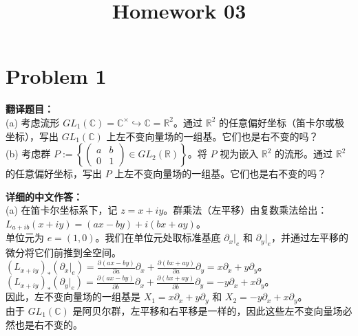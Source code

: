 \documentclass{ctexart}
\begin{document}
\title{Homework 03}
\author{}
\date{}
\maketitle

\section*{Problem 1}
\textbf{翻译题目：}\\
(a) 考虑流形 $GL_1(\mathbb{C}) = \mathbb{C}^\times \hookrightarrow \mathbb{C} = \mathbb{R}^2$。通过 $\mathbb{R}^2$ 的任意偏好坐标（笛卡尔或极坐标），写出 $GL_1(\mathbb{C})$ 上左不变向量场的一组基。它们也是右不变的吗？\\
(b) 考虑群 $P := \left\{\begin{pmatrix} a & b \\ 0 & 1 \end{pmatrix} \in GL_2(\mathbb{R})\right\}$。将 $P$ 视为嵌入 $\mathbb{R}^2$ 的流形。通过 $\mathbb{R}^2$ 的任意偏好坐标，写出 $P$ 上左不变向量场的一组基。它们也是右不变的吗？

\vspace{1em}
\textbf{详细的中文作答：}\\
(a) 在笛卡尔坐标系下，记 $z = x+iy$。群乘法（左平移）由复数乘法给出：$L_{a+ib}(x+iy) = (ax-by) + i(bx+ay)$。\\
单位元为 $e = (1, 0)$。我们在单位元处取标准基底 $\partial_x|_e$ 和 $\partial_y|_e$，并通过左平移的微分将它们前推到全空间。\\
$(L_{x+iy})_* (\partial_x|_e) = \frac{\partial(ax-by)}{\partial a} \partial_x + \frac{\partial(bx+ay)}{\partial a} \partial_y = x\partial_x + y\partial_y$。\\
$(L_{x+iy})_* (\partial_y|_e) = \frac{\partial(ax-by)}{\partial b} \partial_x + \frac{\partial(bx+ay)}{\partial b} \partial_y = -y\partial_x + x\partial_y$。\\
因此，左不变向量场的一组基是 $X_1 = x\partial_x + y\partial_y$ 和 $X_2 = -y\partial_x + x\partial_y$。\\
由于 $GL_1(\mathbb{C})$ 是阿贝尔群，左平移和右平移是一样的，因此这些左不变向量场必然也是右不变的。
\end{document}
